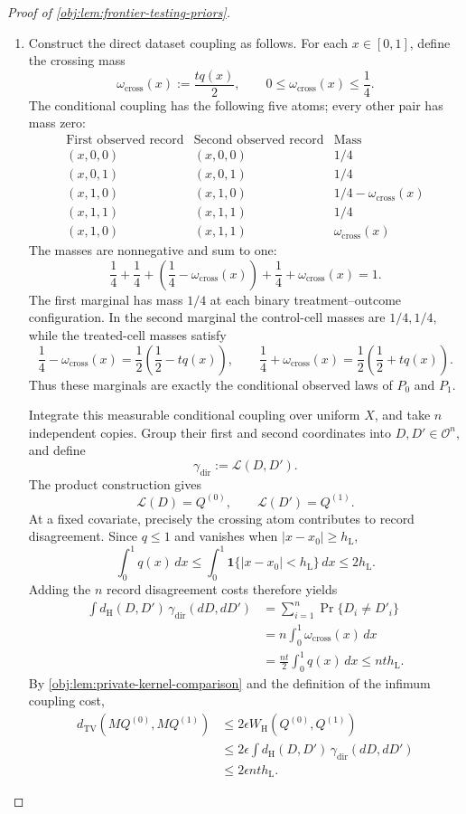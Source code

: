\documentclass[11pt]{article}
\begin{document}
\begin{proof}[Proof of \cref{obj:lem:frontier-testing-priors}]
\begin{enumerate}
\item Construct the direct dataset coupling as follows. For each
\(x\in[0,1]\), define the crossing mass
\[
\omega_{\mathrm{cross}}(x):=\frac{tq(x)}2,
\qquad
0\le\omega_{\mathrm{cross}}(x)\le\frac14.
\]
The conditional coupling has the following five atoms; every other pair
has mass zero:
\[
\begin{array}{c|c|c}
\text{First observed record}&\text{Second observed record}&\text{Mass}\\ \hline
(x,0,0)&(x,0,0)&1/4\\
(x,0,1)&(x,0,1)&1/4\\
(x,1,0)&(x,1,0)&1/4-\omega_{\mathrm{cross}}(x)\\
(x,1,1)&(x,1,1)&1/4\\
(x,1,0)&(x,1,1)&\omega_{\mathrm{cross}}(x)
\end{array}
\]
The masses are nonnegative and sum to one:
\[
\frac14+\frac14+
\left(\frac14-\omega_{\mathrm{cross}}(x)\right)
+\frac14+\omega_{\mathrm{cross}}(x)=1.
\]
The first marginal has mass \(1/4\) at each binary treatment--outcome
configuration. In the second marginal the control-cell masses are
\(1/4,1/4\), while the treated-cell masses satisfy
\[
\frac14-\omega_{\mathrm{cross}}(x)
=\frac12\left(\frac12-tq(x)\right),\qquad
\frac14+\omega_{\mathrm{cross}}(x)
=\frac12\left(\frac12+tq(x)\right).
\]
Thus these marginals are exactly the conditional observed laws of
\(P_0\) and \(P_1\).

Integrate this measurable conditional coupling over uniform \(X\), and
take \(n\) independent copies. Group their first and second coordinates
into \(D,D'\in\mathcal O^n\), and define
\[
\gamma_{\mathrm{dir}}:=\mathcal L(D,D').
\]
The product construction gives
\[
\mathcal L(D)=Q^{(0)},\qquad \mathcal L(D')=Q^{(1)}.
\]
At a fixed covariate, precisely the crossing atom contributes to record
disagreement. Since \(q\le1\) and vanishes when
\(|x-x_0|\ge h_{\mathrm L}\),
\[
\int_0^1q(x)\,dx
\le\int_0^1\mathbf1\{|x-x_0|<h_{\mathrm L}\}\,dx
\le2h_{\mathrm L}.
\]
Adding the \(n\) record disagreement costs therefore yields
\[
\begin{aligned}
\int d_{\mathrm H}(D,D')\,\gamma_{\mathrm{dir}}(dD,dD')
&=\sum_{i=1}^n\Pr\{D_i\ne D'_i\}\\
&=n\int_0^1\omega_{\mathrm{cross}}(x)\,dx\\
&=\frac{nt}{2}\int_0^1q(x)\,dx
\le nth_{\mathrm L}.
\end{aligned}
\]
By \cref{obj:lem:private-kernel-comparison} and the definition of the
infimum coupling cost,
\[
\begin{aligned}
d_{\mathrm{TV}}(MQ^{(0)},MQ^{(1)})
&\le2\epsilon W_{\mathrm H}(Q^{(0)},Q^{(1)})\\
&\le2\epsilon
 \int d_{\mathrm H}(D,D')\,\gamma_{\mathrm{dir}}(dD,dD')\\
&\le2\epsilon nth_{\mathrm L}.
\end{aligned}
\]


\end{enumerate}
\end{proof}
\end{document}
